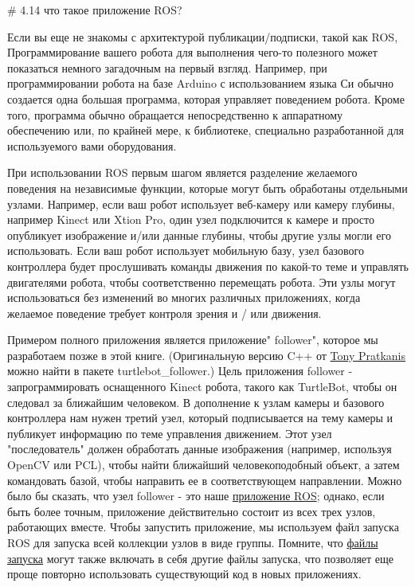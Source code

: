 # 4.14 что такое приложение ROS?


Если вы еще не знакомы с архитектурой публикации/подписки, такой как ROS, Программирование вашего робота для выполнения чего-то полезного может показаться немного загадочным на первый взгляд. Например, при программировании робота на базе Arduino с использованием языка Си обычно создается одна большая программа, которая управляет поведением робота. Кроме того, программа обычно обращается непосредственно к аппаратному обеспечению или, по крайней мере, к библиотеке, специально разработанной для используемого вами оборудования. 

При использовании ROS первым шагом является разделение желаемого поведения на независимые функции, которые могут быть обработаны отдельными узлами. Например, если ваш робот использует веб-камеру или камеру глубины, например Kinect или Xtion Pro, один узел подключится к камере и просто опубликует изображение и/или данные глубины, чтобы другие узлы могли его использовать. Если ваш робот использует мобильную базу, узел базового контроллера будет прослушивать команды движения по какой-то теме и управлять двигателями робота, чтобы соответственно перемещать робота. Эти узлы могут использоваться без изменений во многих различных приложениях, когда желаемое поведение требует контроля зрения и / или движения.

Примером полного приложения является приложение" follower", которое мы разработаем позже в этой книге. (Оригинальную версию C++ от \href{https://www.formicite.com}{Tony Pratkanis} можно найти в пакете turtlebot\_follower.) Цель приложения follower - запрограммировать оснащенного Kinect робота, такого как TurtleBot, чтобы он следовал за ближайшим человеком. В дополнение к узлам камеры и базового контроллера нам нужен третий узел, который подписывается на тему камеры и публикует информацию по теме управления движением. Этот узел "последователь" должен обработать данные изображения (например, используя OpenCV или PCL), чтобы найти ближайший человекоподобный объект, а затем командовать базой, чтобы направить ее в соответствующем направлении. Можно было бы сказать, что узел follower - это наше \href{https://www.formicite.com}{приложение ROS}; однако, если быть более точным, приложение действительно состоит из всех трех узлов, работающих вместе. Чтобы запустить приложение, мы используем файл запуска ROS для запуска всей коллекции узлов в виде группы. Помните, что \href{http://wiki.ros.org/roslaunch/XML/include}{файлы запуска} могут также включать в себя другие файлы запуска, что позволяет еще проще повторно использовать существующий код в новых приложениях.

